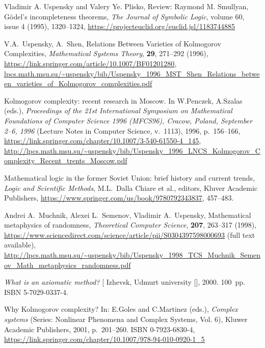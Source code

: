 \documentclass[12pt]{article}
\theoremstyle{remark}
\newcommand{\nb}[1]{{\color{red}}}
\begin{document}
\begin{thebibliography}{99}
Vladimir A. Uspensky and Valery Ye. Plisko, Review: Raymond M. Smullyan, G\"odel's incompleteness theorems, \emph{The Journal of Symbolic Logic},  volume 60, issue 4 (1995), 1320--1324, \url{https://projecteuclid.org/euclid.jsl/1183744885}
	
\nb{scan available}

 V.A.~Uspensky, A.~Shen, Relations Between Varieties of Kolmogorov Complexities, \emph{Mathematical Systems Theory}, \textbf{29}, 271--292 (1996), \url{https://link.springer.com/article/10.1007/BF01201280}, 
\url{lpcs.math.msu.su/~uspensky/bib/Uspensky_1996_MST_Shen_Relations_between_varieties_of_Kolmogorov_complexities.pdf}

Kolmogorov complexity: recent research in Moscow. In W.Penczek, A.Szalas (eds.), \emph{Proceedings of the 21st International Symposium on Mathematical Foundations of Computer Science 1996 (MFCS96), Cracow, Poland, September 2--6, 1996}  (Lecture Notes in Computer Science, v.~1113), 1996, p.~156--166,
\url{https://link.springer.com/chapter/10.1007/3-540-61550-4_145}, \url{http://lpcs.math.msu.su/~uspensky/bib/Uspensky_1996_LNCS_Kolmogorov_Complexity_Recent_trents_Moscow.pdf}

\nb{trents???}
\nb{file available}

Mathematical logic in the former Soviet Union: brief history and current trends,
\emph{Logic and Scientific Methods}, M.L.~Dalla Chiare et al., editors, Kluver Academic Publishers,  \url{https://www.springer.com/us/book/9780792343837}, 457--483.

\nb{dile available}

  Andrei A.~Muchnik, Alexei L.~Semenov, Vladimir A.~Uspensky, Mathematical metaphysics of randomness, \emph{Theoretical Computer Science}, \textbf{207}, 263--317 (1998),  \url{https://www.sciencedirect.com/science/article/pii/S0304397598000693} (full text available), \url{http://lpcs.math.msu.su/~uspensky/bib/Uspensky_1998_TCS_Muchnik_Semenov_Math_metaphysics_randomness.pdf}

\emph{What is an axiomatic method?} [ Izhevsk, Udmurt university [], 2000. 100~pp. ISBN 5-7029-0337-4.

\nb{TeX file available}

Why Kolmogorov complexity? In: E.Goles and C.Martinez (eds.), \emph{Complex systems} (Series: Nonlinear Phenomena and Complex Systems, Vol. 6),  Kluwer Academic Publishers, 2001, p.~201--260. ISBN 0-7923-6830-4, \url{https://link.springer.com/chapter/10.1007/978-94-010-0920-1_5}


\end{thebibliography}
\end{document}
